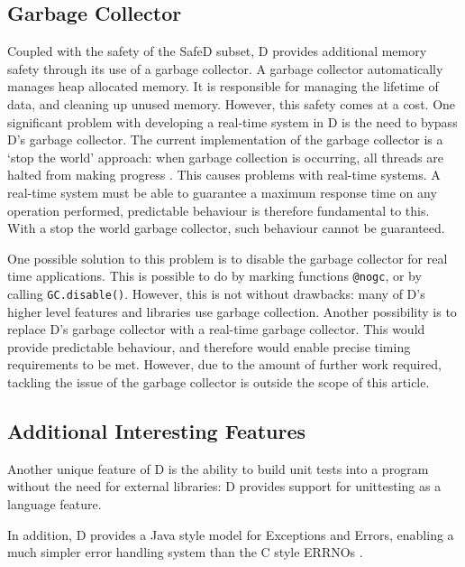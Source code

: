 \subsection{Garbage Collector}
Coupled with the safety of the SafeD subset, D provides additional memory
safety through its use of a garbage collector. A garbage collector
automatically manages heap allocated memory. It is responsible for managing
the lifetime of data, and cleaning up unused memory. 
However, this safety comes at a cost. One significant problem with developing a 
real-time system in D is the need to bypass D's garbage collector. 
The current implementation of the garbage 
collector is a `stop the world' approach: when garbage collection is occurring, 
all threads are halted from making progress 
\cite{dlang-garbage}. This causes problems with 
real-time systems. A real-time system must be able to guarantee a maximum response 
time on any operation performed, predictable behaviour is therefore fundamental to this. 
With a stop the world garbage collector, such behaviour cannot be guaranteed. 
\par\bigskip\noindent
One possible solution to this problem is to disable the garbage collector for 
real time applications. This is possible to do by marking functions \texttt{@nogc}, 
or by calling \texttt{GC.disable()}. However, this is not without drawbacks: 
many of D's higher level features and libraries use garbage collection. 
Another possibility is to replace D's garbage collector with a real-time 
garbage collector. This would provide predictable behaviour, and therefore
would enable precise timing requirements to be met.
However, due to the amount of further work required, tackling the issue of the garbage 
collector is outside the scope of this article.

\subsection{Additional Interesting Features}
Another unique feature of D is the ability to build unit tests into a 
program without the need for external libraries: D provides support for 
unittesting as a language feature. 
\par\bigskip\noindent
In addition, D provides a Java style model for Exceptions and Errors, enabling 
a much simpler error handling system than the C style ERRNOs 
\cite{ddili-book}. 


